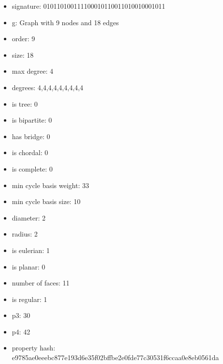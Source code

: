 \newpage
\begin{figure}
\end{figure}
\begin{itemize}
\item signature: 010110100111100010110011010010001011
\item g: Graph with 9 nodes and 18 edges
\item order: 9
\item size: 18
\item max degree: 4
\item degrees: 4,4,4,4,4,4,4,4,4
\item is tree: 0
\item is bipartite: 0
\item has bridge: 0
\item is chordal: 0
\item is complete: 0
\item min cycle basis weight: 33
\item min cycle basis size: 10
\item diameter: 2
\item radius: 2
\item is eulerian: 1
\item is planar: 0
\item number of faces: 11
\item is regular: 1
\item p3: 30
\item p4: 42
\item property hash: e9785ae0eeebc877e193d6e35f02bffbe2e0fde77c30531f6ccaa0e8eb0561da
\end{itemize}
